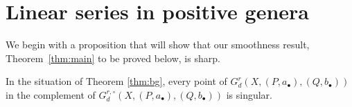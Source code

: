 \documentclass{amsart}
\begin{document}
\section{Linear series in positive genera}\label{sec:proofs}

We begin with a proposition that will show that our smoothness result, Theorem~\ref{thm:main} to be proved below, is sharp.

\begin{prop}\label{prop:non-smooth}
In the situation of Theorem \ref{thm:bg}, 
every point of
$G^r_d(X,(P,a_{\bullet}),(Q,b_{\bullet}))$ in the complement of
$G^{r,\circ}_d(X,(P,a_{\bullet}),(Q,b_{\bullet}))$ is singular.
\end{prop}
\end{document}

